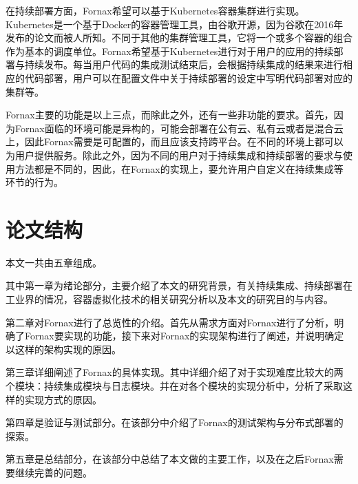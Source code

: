 在持续部署方面，Fornax希望可以基于Kubernetes容器集群进行实现。Kubernetes是一个基于Docker的容器管理工具，由谷歌开源，因为谷歌在2016年发布的论文\cite{Borg}而被人所知。不同于其他的集群管理工具，它将一个或多个容器的组合作为基本的调度单位。Fornax希望基于Kubernetes进行对于用户的应用的持续部署与持续发布。每当用户代码的集成测试结束后，会根据持续集成的结果来进行相应的代码部署，用户可以在配置文件中关于持续部署的设定中写明代码部署对应的集群等。

Fornax主要的功能是以上三点，而除此之外，还有一些非功能的要求。首先，因为Fornax面临的环境可能是异构的，可能会部署在公有云、私有云或者是混合云上，因此Fornax需要是可配置的，而且应该支持跨平台。在不同的环境上都可以为用户提供服务。除此之外，因为不同的用户对于持续集成和持续部署的要求与使用方法都是不同的，因此，在Fornax的实现上，要允许用户自定义在持续集成等环节的行为。

\section{论文结构}

本文一共由五章组成。

其中第一章为绪论部分，主要介绍了本文的研究背景，有关持续集成、持续部署在工业界的情况，容器虚拟化技术的相关研究分析以及本文的研究目的与内容。

第二章对Fornax进行了总览性的介绍。首先从需求方面对Fornax进行了分析，明确了Fornax要实现的功能，接下来对Fornax的实现架构进行了阐述，并说明确定以这样的架构实现的原因。

第三章详细阐述了Fornax的具体实现。其中详细介绍了对于实现难度比较大的两个模块：持续集成模块与日志模块。并在对各个模块的实现分析中，分析了采取这样的实现方式的原因。

第四章是验证与测试部分。在该部分中介绍了Fornax的测试架构与分布式部署的探索。

第五章是总结部分，在该部分中总结了本文做的主要工作，以及在之后Fornax需要继续完善的问题。